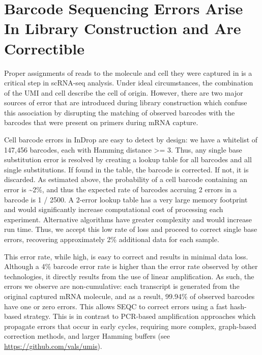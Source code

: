 \section{Barcode Sequencing Errors Arise In Library Construction and Are Correctible} 

Proper assignments of reads to the molecule and cell they were captured in is a critical step in scRNA-seq analysis. 
Under ideal circumstances, the combination of the UMI and cell describe the cell of origin. 
However, there are two major sources of error that are introduced during library construction which confuse this association by disrupting the matching of observed barcodes with the barcodes that were present on primers during mRNA capture. 

Cell barcode errors in InDrop are easy to detect by design: we have a whitelist of 147,456 barcodes, each with Hamming distance \textgreater{}= 3. 
Thus, any single base substitution error is resolved by creating a lookup table for all barcodes and all single substitutions. 
If found in the table, the barcode is corrected.  
If not, it is discarded. 
As estimated above, the probability of a cell barcode containing an error is \textasciitilde{}2\%, and thus the expected rate of barcodes accruing 2 errors in a barcode is 1 / 2500. 
A 2-error lookup table has a very large memory footprint and would significantly increase computational cost of processing each experiment.  
Alternative algorithms have greater complexity and would increase run time. 
Thus, we accept this low rate of loss and proceed to correct single base errors, recovering approximately 2\% additional data for each sample.  

This error rate, while high, is easy to correct and results in minimal data loss. 
Although a 4\% barcode error rate is higher than the error rate observed by other technologies, it directly results from the use of linear amplification. 
As such, the errors we observe are non-cumulative: each transcript is generated from the original captured mRNA molecule, and as a result, 99.94\% of observed barcodes have one or zero errors.
This allows SEQC to correct errors using a fast hash-based strategy. 
This is in contrast to PCR-based amplification approaches which propagate errors that occur in early cycles, requiring more complex, graph-based correction methods, and larger Hamming buffers (see \href{https://github.com/vals/umis}{https://github.com/vals/umis}).

